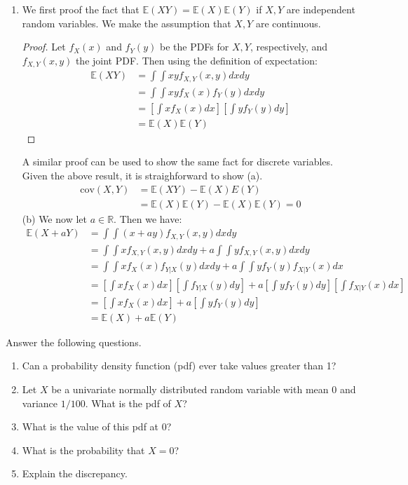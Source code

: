 \documentclass{harvardml}
\newcommand{\E}{\mathbb{E}}
\newcommand{\cov}{\text{cov}}
\begin{document}
\begin{enumerate}[label=(\alph*)]
\item We first proof the fact that $\E(XY) = \E(X)\E(Y)$ if $X,Y$ are independent random variables. We make the assumption that $X,Y$ are continuous.
\begin{proof}
Let $f_X(x)$ and $f_Y(y)$ be the PDFs for $X,Y$, respectively, and $f_{X,Y}(x,y)$ the joint PDF. Then using the definition of expectation:
\begin{align*}
\E(XY) &= \int \int xyf_{X,Y}(x,y)dxdy \\
&= \int \int xyf_{X}(x)f_Y(y)dx dy \tag{independence of $X,Y$} \\
&= \left[\int xf_X(x)dx\right] \left[\int yf_Y(y)dy \right] \tag{properties of integrals}\\
&=\E(X)\E(Y)
\end{align*}
\end{proof}
A similar proof can be used to show the same fact for discrete variables. Given the above result, it is straighforward to show (a).
\begin{align*}
\cov(X,Y) &= \E(XY) - \E(X)E(Y) \\
&= \E(X)\E(Y) - \E(X)\E(Y) = 0 \tag{by independence of $X,Y$}
\end{align*}
(b) We now let $a \in \mathbb{R}$. Then we have:
\begin{align*}
\E(X + aY) &= \int \int (x+ay)f_{X,Y}(x,y) dx dy \\
&= \int \int xf_{X,Y}(x,y) dx dy + a\int \int y f_{X,Y}(x,y) dx dy \tag{linearity of integration} \\
&= \int \int xf_X(x)f_{Y|X}(y) dx dy + a \int \int yf_{Y}(y)f_{X|Y}(x)dx \tag{definition of joint distribution}\\
&= \left[\int xf_X(x) dx \right] \left[\int f_{Y|X}(y)dy \right] + a\left[\int yf_Y(y)dy \right]\left[\int f_{X|Y}(x)dx \right] \\
&= \left[\int xf_X(x) dx \right] + a\left[\int yf_Y(y)dy \right] \tag{integral on entire support is $1$} \\
&= \E(X) + a\E(Y)
\end{align*}
\end{enumerate}


\begin{problem}[Densities]
Answer the following questions.
\begin{enumerate}[label=(\alph*)]
  \item Can a probability density function (pdf) ever take values greater than 1?
  \item Let $X$ be a univariate normally distributed random variable with mean 0 and variance $1/100$. What is the pdf of $X$?
  \item What is the value of this pdf at 0?
  \item What is the probability that $X = 0$?
  \item Explain the discrepancy.
\end{enumerate}
\end{problem}
\end{document}
